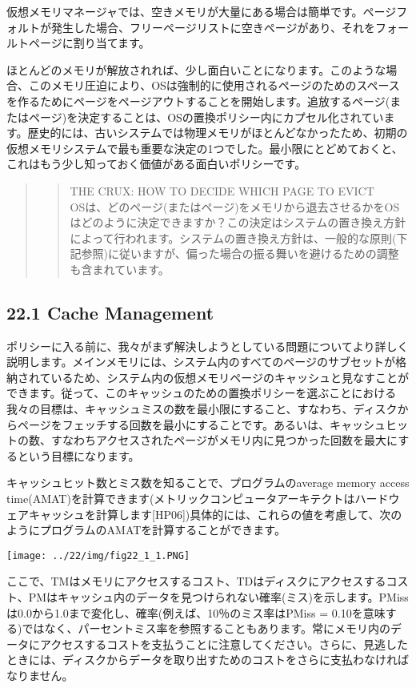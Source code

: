仮想メモリマネージャでは、空きメモリが大量にある場合は簡単です。ページフォルトが発生した場合、フリーページリストに空きページがあり、それをフォールトページに割り当てます。

ほとんどのメモリが解放されれば、少し面白いことになります。このような場合、このメモリ圧迫により、OSは強制的に使用されるページのためのスペースを作るためにページをページアウトすることを開始します。追放するページ(またはページ)を決定することは、OSの置換ポリシー内にカプセル化されています。歴史的には、古いシステムでは物理メモリがほとんどなかったため、初期の仮想メモリシステムで最も重要な決定の1つでした。最小限にとどめておくと、これはもう少し知っておく価値がある面白いポリシーです。

\begin{quote}
\begin{quote}
THE CRUX: HOW TO DECIDE WHICH PAGE TO EVICT\\
OSは、どのページ(またはページ)をメモリから退去させるかをOSはどのように決定できますか？この決定はシステムの置き換え方針によって行われます。システムの置き換え方針は、一般的な原則(下記参照)に従いますが、偏った場合の振る舞いを避けるための調整も含まれています。
\end{quote}
\end{quote}

\hypertarget{cache-management}{%
\subsection*{22.1 Cache Management}\label{cache-management}}

ポリシーに入る前に、我々がまず解決しようとしている問題についてより詳しく説明します。メインメモリには、システム内のすべてのページのサブセットが格納されているため、システム内の仮想メモリページのキャッシュと見なすことができます。従って、このキャッシュのための置換ポリシーを選ぶことにおける我々の目標は、キャッシュミスの数を最小限にすること、すなわち、ディスクからページをフェッチする回数を最小にすることです。あるいは、キャッシュヒットの数、すなわちアクセスされたページがメモリ内に見つかった回数を最大にするという目標になります。

キャッシュヒット数とミス数を知ることで、プログラムのaverage memory
access
time(AMAT)を計算できます(メトリックコンピュータアーキテクトはハードウェアキャッシュを計算します{[}HP06{]})具体的には、これらの値を考慮して、次のようにプログラムのAMATを計算することができます。

\texttt{[image: ../22/img/fig22\_1\_1.PNG]}

ここで、TMはメモリにアクセスするコスト、TDはディスクにアクセスするコスト、PMはキャッシュ内のデータを見つけられない確率(ミス)を示します。PMissは0.0から1.0まで変化し、確率(例えば、10％のミス率はPMiss
=
0.10を意味する)ではなく、パーセントミス率を参照することもあります。常にメモリ内のデータにアクセスするコストを支払うことに注意してください。さらに、見逃したときには、ディスクからデータを取り出すためのコストをさらに支払わなければなりません。


